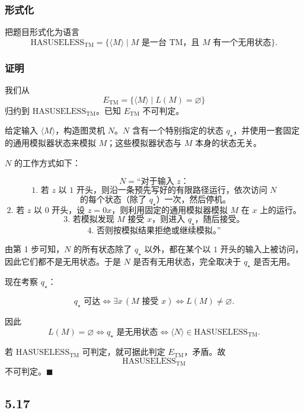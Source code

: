 \begin{answerred}
\subsubsection*{形式化}

把题目形式化为语言
\[
\mathrm{HASUSELESS}_{\mathrm{TM}}
=
\{\langle M\rangle\mid M\text{ 是一台 TM，且 }M\text{ 有一个无用状态}\}.
\]

\subsubsection*{证明}

我们从
\[
E_{\mathrm{TM}}=\{\langle M\rangle\mid L(M)=\varnothing\}
\]
归约到 $\mathrm{HASUSELESS}_{\mathrm{TM}}$。已知 $E_{\mathrm{TM}}$ 不可判定。

给定输入 $\langle M\rangle$，构造图灵机 $N$。$N$ 含有一个特别指定的状态 $q_\star$，并使用一套固定的通用模拟器状态来模拟 $M$；这些模拟器状态与 $M$ 本身的状态无关。

$N$ 的工作方式如下：

\[
N=\text{``对于输入 }z\text{：}
\]
\[
\text{1. 若 }z\text{ 以 }1\text{ 开头，则沿一条预先写好的有限路径运行，依次访问 }N
\]
\[
\text{\ \ \ \ 的每个状态（除了 }q_\star\text{）一次，然后停机。}
\]
\[
\text{2. 若 }z\text{ 以 }0\text{ 开头，设 }z=0x\text{，则利用固定的通用模拟器模拟 }M\text{ 在 }x\text{ 上的运行。}
\]
\[
\text{3. 若模拟发现 }M\text{ 接受 }x\text{，则进入 }q_\star\text{，随后接受。}
\]
\[
\text{4. 否则按模拟结果拒绝或继续模拟。''}
\]

由第 1 步可知，$N$ 的所有状态除了 $q_\star$ 以外，都在某个以 $1$ 开头的输入上被访问，因此它们都不是无用状态。于是 $N$ 是否有无用状态，完全取决于 $q_\star$ 是否无用。

现在考察 $q_\star$：

\[
q_\star\text{ 可达}
\iff
\exists x\, (M\text{ 接受 }x)
\iff
L(M)\neq\varnothing.
\]

因此
\[
L(M)=\varnothing
\iff
q_\star\text{ 是无用状态}
\iff
\langle N\rangle\in \mathrm{HASUSELESS}_{\mathrm{TM}}.
\]

若 $\mathrm{HASUSELESS}_{\mathrm{TM}}$ 可判定，就可据此判定 $E_{\mathrm{TM}}$，矛盾。故
\[
\mathrm{HASUSELESS}_{\mathrm{TM}}
\]
不可判定。$\blacksquare$

\end{answerred}
\subsection*{5.17}

